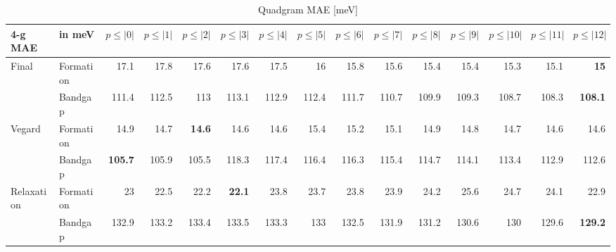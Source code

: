 \documentclass[11pt,oneside,czech,american]{book} %
\theoremstyle{definition} %
\theoremstyle{definition}
\begin{document}
\begin{table}[H]
	\scriptsize
	\centering
\begin{tabular}{llrrrrrrrrrrrrr}
	\hline
	4-g MAE    & in meV    &   $p{\leq}|0|$ &   $p{\leq}|1|$ &   $p{\leq}|2|$ &   $p{\leq}|3|$ &   $p{\leq}|4|$ &   $p{\leq}|5|$ &   $p{\leq}|6|$ &   $p{\leq}|7|$ &   $p{\leq}|8|$ &   $p{\leq}|9|$ &   $p{\leq}|10|$ &   $p{\leq}|11|$ &   $p{\leq}|12|$ \\
	\hline
	\multirow{2}{*}{Final}      & Formation &       17.1 &       17.8 &       17.6 &       17.6 &       17.5 &       16   &       15.8 &       15.6 &       15.4 &       15.4 &        15.3 &        15.1 &        \textbf{15}   \\
	     & Bandgap   &      111.4 &      112.5 &      113   &      113.1 &      112.9 &      112.4 &      111.7 &      110.7 &      109.9 &      109.3 &       108.7 &       108.3 &       \textbf{108.1} \\
	\multirow{2}{*}{Vegard}     & Formation &       14.9 &       14.7 &       \textbf{14.6} &       14.6 &       14.6 &       15.4 &       15.2 &       15.1 &       14.9 &       14.8 &        14.7 &        14.6 &        14.6 \\
	     & Bandgap   &      \textbf{105.7} &      105.9 &      105.5 &      118.3 &      117.4 &      116.4 &      116.3 &      115.4 &      114.7 &      114.1 &       113.4 &       112.9 &       112.6 \\
	\multirow{2}{*}{Relaxation} & Formation &       23   &       22.5 &       22.2 &       \textbf{22.1} &       23.8 &       23.7 &       23.8 &       23.9 &       24.2 &       25.6 &        24.7 &        24.1 &        22.9 \\
	 & Bandgap   &      132.9 &      133.2 &      133.4 &      133.5 &      133.3 &      133   &      132.5 &      131.9 &      131.2 &      130.6 &       130   &       129.6 &       \textbf{129.2} \\
	\hline
\end{tabular}
	\caption{Quadgram MAE [meV]}
	\label{4-g MAE hat}
\end{table}
\end{document}
